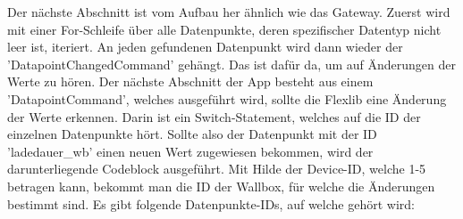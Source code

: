 Der nächste Abschnitt ist vom Aufbau her ähnlich wie das Gateway. Zuerst wird mit einer For-Schleife über alle Datenpunkte, deren spezifischer Datentyp nicht leer ist, iteriert. An jeden gefundenen Datenpunkt wird dann wieder der 'DatapointChangedCommand' gehängt. Das ist dafür da, um auf Änderungen der Werte zu hören. Der nächste Abschnitt der App besteht aus einem 'DatapointCommand', welches ausgeführt wird, sollte die Flexlib eine Änderung der Werte erkennen. Darin ist ein Switch-Statement, welches auf die ID der einzelnen Datenpunkte hört. Sollte also der Datenpunkt mit der ID 'ladedauer\_wb' einen neuen Wert zugewiesen bekommen, wird der darunterliegende Codeblock ausgeführt. Mit Hilde der Device-ID, welche 1-5 betragen kann, bekommt man die ID der Wallbox, für welche die Änderungen bestimmt sind. Es gibt folgende Datenpunkte-IDs, auf welche gehört wird:

